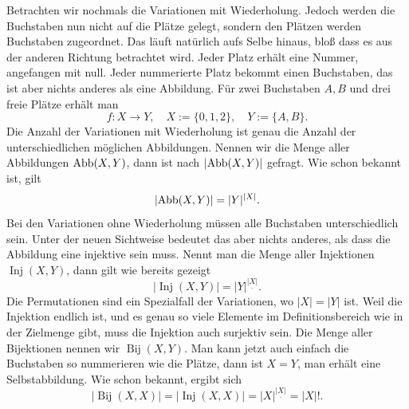 Betrachten wir nochmals die Variationen mit Wiederholung. Jedoch werden
die Buchstaben nun nicht auf die Plätze gelegt, sondern den Plätzen
werden Buchstaben zugeordnet. Das läuft natürlich aufs Selbe hinaus,
bloß dass es aus der anderen Richtung betrachtet wird. Jeder Platz
erhält eine Nummer, angefangen mit null. Jeder nummerierte Platz
bekommt einen Buchstaben, das ist aber nichts anderes als eine
Abbildung. Für zwei Buchstaben $A,B$ und drei freie Plätze
erhält man
\[f\colon X\to Y,\quad X:=\{0,1,2\},\quad Y:=\{A,B\}.\]
Die Anzahl der Variationen mit Wiederholung ist genau die Anzahl
der unterschiedlichen möglichen Abbildungen. Nennen wir die Menge aller
Abbildungen $\operatorname{Abb}(X,Y)$, dann ist nach $|{\operatorname{Abb}(X,Y)}|$ gefragt.
Wie schon bekannt ist, gilt%
\begin{equation}\label{eq:Anzahl-Abb}
|{\operatorname{Abb}(X,Y)}| = |Y|^{|X|}.
\end{equation}
Bei den Variationen ohne Wiederholung müssen alle Buchstaben
unterschiedlich sein. Unter der neuen Sichtweise bedeutet das aber
nichts anderes, als dass die Abbildung eine injektive sein muss.
Nennt man die Menge aller Injektionen $\operatorname{Inj}(X,Y)$,
dann gilt wie bereits gezeigt%
\[|{\operatorname{Inj}(X,Y)}| = |Y|^{\underline{|X|}}.\]
Die Permutationen sind ein Spezialfall der Variationen,
wo $|X|=|Y|$ ist. Weil die Injektion endlich ist, und es genau
so viele Elemente im Definitionsbereich wie in der Zielmenge gibt,
muss die Injektion auch surjektiv sein. Die Menge aller Bijektionen
nennen wir $\operatorname{Bij}(X,Y)$. Man kann jetzt auch einfach
die Buchstaben so nummerieren wie die Plätze, dann ist $X=Y$,
man erhält eine Selbstabbildung. Wie schon bekannt, ergibt sich%
\[|{\operatorname{Bij}(X,X)}| = |{\operatorname{Inj}(X,X)}|
= |X|^{\underline{|X|}} = |X|!.\]


